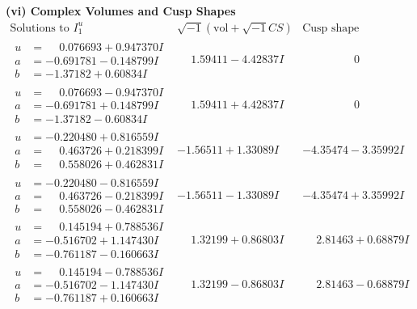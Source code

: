 \documentclass[1p]{elsarticle_modified}
\theoremstyle{definition}
\newcommand{\I}{\sqrt{-1}}
\begin{document}
\newpage\flushleft \textbf{(vi) Complex Volumes and Cusp Shapes}
$$\begin{array}{c|c|c}  
\text{Solutions to }I^u_{1}& \I (\text{vol} + \sqrt{-1}CS) & \text{Cusp shape}\\
 \hline 
\begin{aligned}
u &= \phantom{-}0.076693 + 0.947370 I \\
a &= -0.691781 - 0.148799 I \\
b &= -1.37182 + 0.60834 I\end{aligned}
 & \phantom{-}1.59411 - 4.42837 I & \phantom{-0.000000 } 0 \\ \hline\begin{aligned}
u &= \phantom{-}0.076693 - 0.947370 I \\
a &= -0.691781 + 0.148799 I \\
b &= -1.37182 - 0.60834 I\end{aligned}
 & \phantom{-}1.59411 + 4.42837 I & \phantom{-0.000000 } 0 \\ \hline\begin{aligned}
u &= -0.220480 + 0.816559 I \\
a &= \phantom{-}0.463726 + 0.218399 I \\
b &= \phantom{-}0.558026 + 0.462831 I\end{aligned}
 & -1.56511 + 1.33089 I & -4.35474 - 3.35992 I \\ \hline\begin{aligned}
u &= -0.220480 - 0.816559 I \\
a &= \phantom{-}0.463726 - 0.218399 I \\
b &= \phantom{-}0.558026 - 0.462831 I\end{aligned}
 & -1.56511 - 1.33089 I & -4.35474 + 3.35992 I \\ \hline\begin{aligned}
u &= \phantom{-}0.145194 + 0.788536 I \\
a &= -0.516702 + 1.147430 I \\
b &= -0.761187 - 0.160663 I\end{aligned}
 & \phantom{-}1.32199 + 0.86803 I & \phantom{-}2.81463 + 0.68879 I \\ \hline\begin{aligned}
u &= \phantom{-}0.145194 - 0.788536 I \\
a &= -0.516702 - 1.147430 I \\
b &= -0.761187 + 0.160663 I\end{aligned}
 & \phantom{-}1.32199 - 0.86803 I & \phantom{-}2.81463 - 0.68879 I \\ \hline\begin{aligned}

\end{aligned}
\end{array}$$
\end{document}
